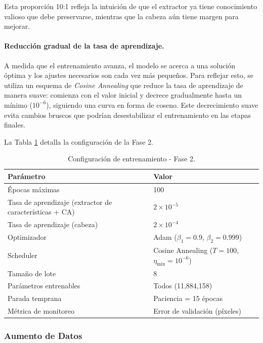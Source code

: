 Esta proporción 10:1 refleja la intuición de que el extractor ya tiene conocimiento valioso que debe preservarse, mientras que la cabeza aún tiene margen para mejorar.

\paragraph{Reducción gradual de la tasa de aprendizaje.}
A medida que el entrenamiento avanza, el modelo se acerca a una solución óptima y los ajustes necesarios son cada vez más pequeños. Para reflejar esto, se utiliza un esquema de \textit{Cosine Annealing} \cite{loshchilov2016sgdr} que reduce la tasa de aprendizaje de manera suave: comienza con el valor inicial y decrece gradualmente hasta un mínimo ($10^{-6}$), siguiendo una curva en forma de coseno. Este decrecimiento suave evita cambios bruscos que podrían desestabilizar el entrenamiento en las etapas finales.

La Tabla \ref{tab:fase2_config} detalla la configuración de la Fase 2.

\begin{table}[htbp]
    \centering
    \caption{Configuración de entrenamiento - Fase 2.}
    \label{tab:fase2_config}
    \small
    \begin{tabular}{@{}ll@{}}
        \toprule
        \textbf{Parámetro} & \textbf{Valor} \\
        \midrule
        Épocas máximas & 100 \\
        Tasa de aprendizaje (extractor de caracter\'isticas + CA) & $2 \times 10^{-5}$ \\
        Tasa de aprendizaje (cabeza) & $2 \times 10^{-4}$ \\
        Optimizador & Adam ($\beta_1=0.9$, $\beta_2=0.999$) \\
        Scheduler & Cosine Annealing ($T=100$, $\eta_{\min}=10^{-6}$) \\
        Tamaño de lote & 8 \\
        Parámetros entrenables & Todos (11,884,158) \\
        Parada temprana & Paciencia = 15 épocas \\
        Métrica de monitoreo & Error de validación (píxeles) \\
        \bottomrule
    \end{tabular}
\end{table}

\subsubsection{Aumento de Datos}

